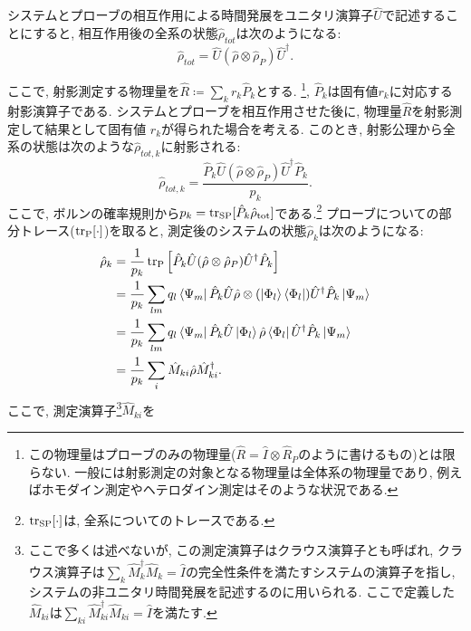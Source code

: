 システムとプローブの相互作用による時間発展をユニタリ演算子\(\hat{U}\)で記述することにすると, 相互作用後の全系の状態\(\hat{\rho}_{\si{tot}}\)は次のようになる:
\begin{equation}
  \hat{\rho}_{\si{tot}}=\hat{U}(\hat{\rho}\otimes\hat{\rho}_P)\hat{U}^\dag.
\end{equation}

ここで, 射影測定する物理量を\(\hat{R}\coloneqq\sum_{k}r_k\hat{P}_k\)とする. \footnote{この物理量はプローブのみの物理量(\(\hat{R}=\hat{I}\otimes\hat{R}_{\si{P}}\)のように書けるもの)とは限らない. 一般には射影測定の対象となる物理量は全体系の物理量であり, 例えばホモダイン測定やヘテロダイン測定はそのような状況である.}, \(\hat{P}_k\)は固有値\(r_k\)に対応する射影演算子である. システムとプローブを相互作用させた後に, 物理量\(\hat{R}\)を射影測定して結果として固有値 \(r_k\)が得られた場合を考える. このとき, 射影公理から全系の状態は次のような\(\hat{\rho}_{\si{tot},k}\)に射影される: 
\begin{equation}
  \hat{\rho}_{\si{tot},k}=\frac{\hat{P}_k\hat{U}(\hat{\rho}\otimes\hat{\rho}_P)\hat{U}^\dag\hat{P}_k}{p_k}.
\end{equation}
ここで, ボルンの確率規則から\(p_k=\tr_{\si{SP}}[\hat{P}_k\hat{\rho}_{\si{tot}}]\)である.\footnote{\(\tr_{\si{SP}}[\cdot]\)は, 全系についてのトレースである.}  プローブについての部分トレース(\(\tr_{\si{P}}[\cdot]\))を取ると, 測定後のシステムの状態\(\hat{\rho}_k\)は次のようになる:
\begin{equation}
  \begin{aligned}
    \hat{\rho}_k&=\frac{1}{p_k}\tr_{\si{P}}\left[\hat{P}_k\hat{U}(\hat{\rho}\otimes\hat{\rho}_P)\hat{U}^\dag\hat{P}_k\right]\\
    &=\frac{1}{p_k}\sum_{lm}q_l\bra{\Psi_m}\hat{P}_k\hat{U}\hat{\rho}\otimes(\ket{\Phi_l}\bra{\Phi_l})\hat{U}^\dag\hat{P}_k\ket{\Psi_m}\\
    &=\frac{1}{p_k}\sum_{lm}q_l\bra{\Psi_m}\hat{P}_k\hat{U}\ket{\Phi_l}\hat{\rho}\bra{\Phi_l}\hat{U}^\dag\hat{P}_k\ket{\Psi_m}\\
    &=\frac{1}{p_k}\sum_{i}\hat{M}_{ki}\hat{\rho}\hat{M}_{ki}^\dag.
  \end{aligned}
\end{equation}
ここで, 測定演算子\footnote{ここで多くは述べないが, この測定演算子はクラウス演算子とも呼ばれ, クラウス演算子は\(\sum_{k}\hat{M}_{k}^\dag\hat{M}_{k}=\hat{I}\)の完全性条件を満たすシステムの演算子を指し, システムの非ユニタリ時間発展を記述するのに用いられる. ここで定義した\(\hat{M}_{ki}\)は\(\sum_{ki}\hat{M}^\dag_{ki}\hat{M}_{ki}=\hat{I}\)を満たす.}\(\hat{M}_{ki}\)を
